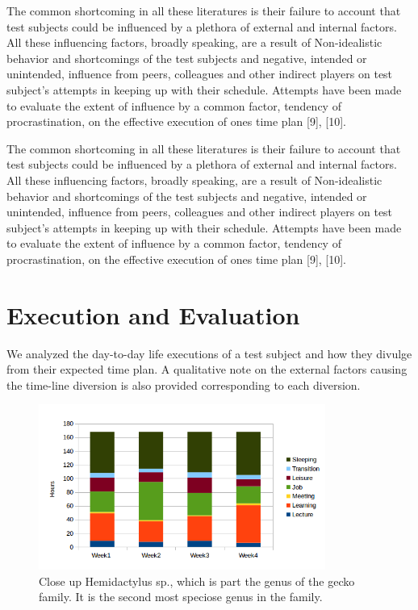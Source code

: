 \documentclass[conference]{IEEEtran}
\begin{document}
The common shortcoming in all these literatures is their failure to account that test subjects could be influenced by a plethora of external and internal factors. All these influencing factors, broadly speaking, are a result of Non-idealistic behavior and shortcomings of the test subjects and negative, intended or unintended, influence from peers, colleagues and other indirect players on test subject's attempts in keeping up with their schedule. Attempts have been made to evaluate the extent of influence by a common factor, tendency of procrastination, on the effective execution of ones time plan [9], [10]. 

The common shortcoming in all these literatures is their failure to account that test subjects could be influenced by a plethora of external and internal factors. All these influencing factors, broadly speaking, are a result of Non-idealistic behavior and shortcomings of the test subjects and negative, intended or unintended, influence from peers, colleagues and other indirect players on test subject's attempts in keeping up with their schedule. Attempts have been made to evaluate the extent of influence by a common factor, tendency of procrastination, on the effective execution of ones time plan [9], [10]. 

\section{Execution and Evaluation}
We analyzed the day-to-day life executions of a test subject and how they divulge from their expected time plan. A qualitative note on the external factors causing the time-line diversion is also provided corresponding to each diversion.

\begin{figure}[hb]
  \centering
  \includegraphics[width=3.7in]{bar}
  \caption[]
   {Close up Hemidactylus sp., which is
   part the genus of the gecko family. It is the
   second most speciose genus in the family.}
\end{figure}
\end{document}
